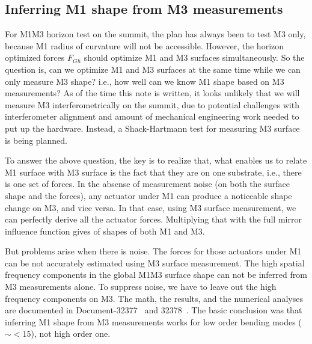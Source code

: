\documentclass [twoside,openbib,12pt]{article}
\begin{document}
  \subsection{Inferring M1 shape from M3 measurements}

For M1M3 horizon test on the summit, the plan has always been to test
M3 only, because M1 radius of curvature will not be accessible.
However, the horizon optimized forces $F_{Gh}$ should optimize M1 and
M3 surfaces simultaneously. So the question is, can we optimize M1 and
M3 surfaces at the same time while we can only measure M3 shape? i.e., how
well can we know M1 shape based on M3 measurements?
As of the time this note is written, it looks unlikely that we will
measure M3 interferometrically on the summit, due to potential
challenges with interferometer alignment and amount of mechanical
engineering work needed to put up the hardware. Instead, a
Shack-Hartmann test for measuring M3 surface is being planned.

To answer the above question, the key is to realize that, what enables
us to relate M1 surface with M3 surface is the fact that they are on
one substrate, i.e., there is one set of forces.
In the absense of measurement noise (on both the surface shape and the
forces), any actuator under M1 can produce a noticeable shape change
on M3, and vice versa. In that case, using M3 surface measurement, we
can perfectly derive all the actuator forces. Multiplying that with the
full mirror influence function gives of shapes of both M1 and M3.

But problems arise when there is noise.
The forces for those actuators under M1 can be not accurately
estimated using M3 surface measurement.
The high spatial frequency
components in the global M1M3 surface shape can not be inferred from
M3 measurements alone.
To suppress noise, we have to leave out the high frequency components
on M3.
The math, the results, and the numerical analyses are documented in
Document-32377~\cite{inferm1p1} and 32378~\cite{inferm1p2}.
The basic conclusion was that
inferring M1 shape from M3 measurements works for low order bending modes ($\sim<$15), not high order one.
\end{document}
